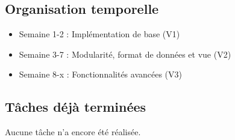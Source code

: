 \documentclass{article}
\begin{document}
\subsection{Organisation temporelle}
\begin{itemize}
    \item Semaine 1-2 : Implémentation de base (V1)
    \item Semaine 3-7 : Modularité, format de données et vue (V2)
    \item Semaine 8-x : Fonctionnalités avancées (V3)
\end{itemize}

\subsection{Tâches déjà terminées}
Aucune tâche n'a encore été réalisée.
\end{document}

